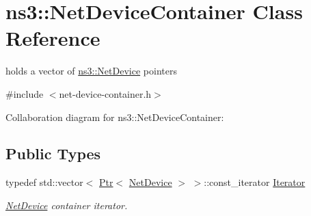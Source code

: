 \hypertarget{classns3_1_1NetDeviceContainer}{}\section{ns3\+:\+:Net\+Device\+Container Class Reference}
\label{classns3_1_1NetDeviceContainer}


holds a vector of \hyperlink{classns3_1_1NetDevice}{ns3\+::\+Net\+Device} pointers  




{\ttfamily \#include $<$net-\/device-\/container.\+h$>$}



Collaboration diagram for ns3\+:\+:Net\+Device\+Container\+:
\subsection*{Public Types}
\begin{DoxyCompactItemize}
\item 
typedef std\+::vector$<$ \hyperlink{classns3_1_1Ptr}{Ptr}$<$ \hyperlink{classns3_1_1NetDevice}{Net\+Device} $>$ $>$\+::const\+\_\+iterator \hyperlink{classns3_1_1NetDeviceContainer_a45709bb572f975569ed985fa89b132f8}{Iterator}
\begin{DoxyCompactList}\small\item\em \hyperlink{classns3_1_1NetDevice}{Net\+Device} container iterator. \end{DoxyCompactList}\end{DoxyCompactItemize}
